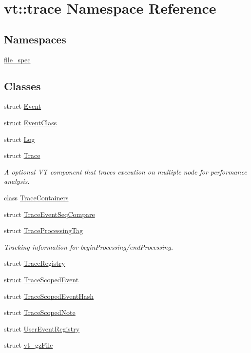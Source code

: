\hypertarget{namespacevt_1_1trace}{}\section{vt\+:\+:trace Namespace Reference}
\label{namespacevt_1_1trace}
\subsection*{Namespaces}
\begin{DoxyCompactItemize}
\item 
 \hyperlink{namespacevt_1_1trace_1_1file__spec}{file\+\_\+spec}
\end{DoxyCompactItemize}
\subsection*{Classes}
\begin{DoxyCompactItemize}
\item 
struct \hyperlink{structvt_1_1trace_1_1_event}{Event}
\item 
struct \hyperlink{structvt_1_1trace_1_1_event_class}{Event\+Class}
\item 
struct \hyperlink{structvt_1_1trace_1_1_log}{Log}
\item 
struct \hyperlink{structvt_1_1trace_1_1_trace}{Trace}
\begin{DoxyCompactList}\small\item\em A optional VT component that traces execution on multiple node for performance analysis. \end{DoxyCompactList}\item 
class \hyperlink{classvt_1_1trace_1_1_trace_containers}{Trace\+Containers}
\item 
struct \hyperlink{structvt_1_1trace_1_1_trace_event_seq_compare}{Trace\+Event\+Seq\+Compare}
\item 
struct \hyperlink{structvt_1_1trace_1_1_trace_processing_tag}{Trace\+Processing\+Tag}
\begin{DoxyCompactList}\small\item\em Tracking information for begin\+Processing/end\+Processing. \end{DoxyCompactList}\item 
struct \hyperlink{structvt_1_1trace_1_1_trace_registry}{Trace\+Registry}
\item 
struct \hyperlink{structvt_1_1trace_1_1_trace_scoped_event}{Trace\+Scoped\+Event}
\item 
struct \hyperlink{structvt_1_1trace_1_1_trace_scoped_event_hash}{Trace\+Scoped\+Event\+Hash}
\item 
struct \hyperlink{structvt_1_1trace_1_1_trace_scoped_note}{Trace\+Scoped\+Note}
\item 
struct \hyperlink{structvt_1_1trace_1_1_user_event_registry}{User\+Event\+Registry}
\item 
struct \hyperlink{structvt_1_1trace_1_1vt__gz_file}{vt\+\_\+gz\+File}
\end{DoxyCompactItemize}
